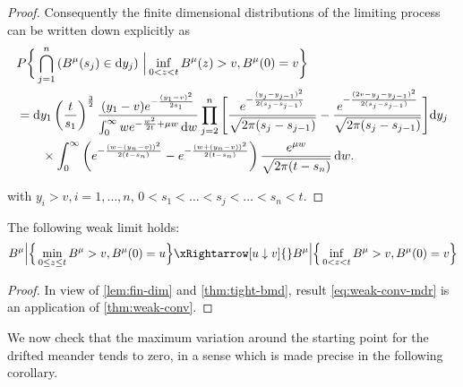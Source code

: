 \begin{proof}
Consequently the finite dimensional distributions of the limiting process can be written 
down explicitly as
\begin{align*}
&P \bigg\{ \bigcap_{j=1}^n \left( B^\mu(s_j) \in \mathrm d y_j \right) \,\Big \vert \inf_{0< z < t} B^\mu(z)> v , B^\mu(0)=v \bigg \}	
\\
&=
%
%
\mathrm d y_1 \left(\frac t{s_1} \right)^{\frac 32} 
\frac{
	(y_1 - v) e^{  -\frac{(y_1-v)^2}{2s_1}  }
}{
	\int_0^{\infty} w  e^{  - \frac { w^2 } { 2t } + \mu w }  \,\mathrm d w
}
%
\prod_{j=2}^{n} \Bigg[
\frac{
	e^{- \frac{ (y_j - y_{j-1} )^2}{2 (s_j - s_{j-1}) } } 
}{ %
	\sqrt{2\pi (s_j - s_{j-1}) } } - 
%
\frac{
	e^{- \frac{ (2v - y_j - y_{j-1} )^2}{2 (s_j - s_{j-1}) } } 
}{ %
	\sqrt{2\pi (s_j - s_{j-1}) } }	\Bigg] \mathrm d y_j 
\\
& \qquad \times 
%
%
\int_0^\infty  \left( e^{ - \frac{(w-(y_n-v) )^2}{2 ( t-s_n)}}  - e^{ - \frac{(w + (y_n - v ) )^2}{2 ( t-s_n)}}  \right)
\frac{e^{\mu w }}{\sqrt{2 \pi( t-s_n)}} \, \mathrm d w  . 
\end{align*}

with $ y_i > v, i=1, \ldots,n $,  $ 0< s_1 < \ldots < s_j < \ldots < s_n < t $.


\end{proof}


\begin{theorem}\label{thm:weak-conv-mdr}
	The following weak limit holds:
	\begin{equation}\label{eq:weak-conv-mdr}
	B^\mu \Big |\Big \{  \min_{ 0 \leq z \leq t } B^\mu > v, B^\mu(0) = u \Big \} \xRightarrow[u\downarrow v]{}
	B^\mu \Big | \Big \{ \inf_{ 0 < z < t } B^\mu > v, B^\mu(0) = v \Big \}
	\end{equation}
\end{theorem}
\begin{proof}
	In view of \autoref{lem:fin-dim} and \autoref{thm:tight-bmd}, result \eqref{eq:weak-conv-mdr} is an application of \autoref{thm:weak-conv}. 
\end{proof}





We now check that the maximum variation around the starting point for the drifted meander 
tends to zero, in a sense which is made precise in the following corollary. 


